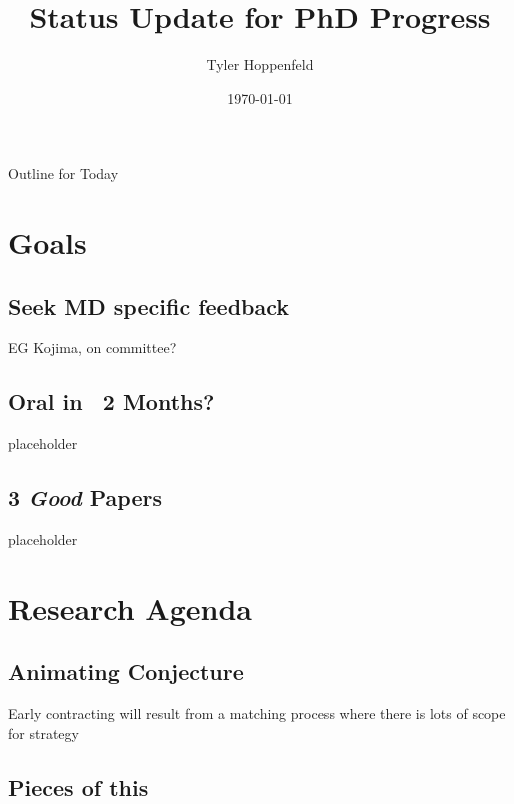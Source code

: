 \documentclass{beamer}
\title[Phd Status]{Status Update for PhD Progress}
\author{Tyler Hoppenfeld}
\institute{UC Davis}
\date{\today}
\begin{document}
\begin{frame}
  \titlepage
\end{frame}

\begin{frame}{Outline for Today}
  \tableofcontents
\end{frame}

\section{Goals}

\subsection{Seek MD specific feedback}

\begin{frame}
	EG Kojima, on committee?
\end{frame}


\subsection{Oral in ~2 Months?}

\begin{frame}
placeholder
\end{frame}

\subsection{3 \emph{Good} Papers}

\begin{frame}
	placeholder
\end{frame}

\section{Research Agenda}
\subsection{Animating Conjecture}
\begin{frame}
	Early contracting will  result from a matching process where there is lots of scope for strategy 
\end{frame}

\subsection{Pieces of this}
\end{document}
